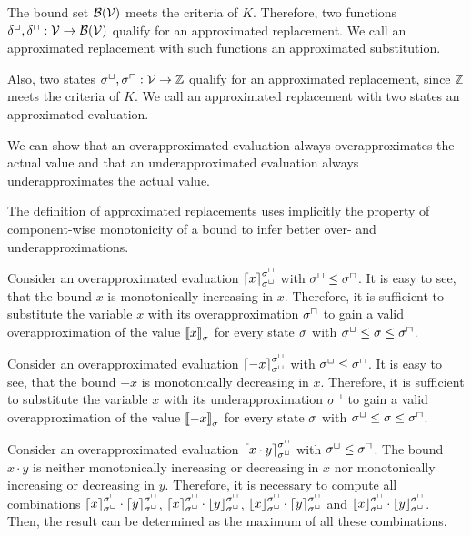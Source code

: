 The bound set $\mathcal{B}(\mathcal{V})$ meets the criteria of $K$.
Therefore, two functions $\delta^\sqcup, \delta^\sqcap: \mathcal{V} \rightarrow \mathcal{B}(\mathcal{V})$ qualify for an approximated replacement.
We call an approximated replacement with such functions an approximated substitution.

Also, two states ${\sigma^\sqcup}, {\sigma^\sqcap}: \mathcal{V} \rightarrow \mathbb{Z}$ qualify for an approximated replacement, since $\mathbb{Z}$ meets the criteria of $K$.
We call an approximated replacement with two states an approximated evaluation.

We can show that an overapproximated evaluation always overapproximates the actual value and that an underapproximated evaluation always underapproximates the actual value.



\begin{example}
  The definition of approximated replacements uses implicitly the property of component-wise monotonicity of a bound to infer better over- and underapproximations.

  Consider an overapproximated evaluation $\left\lceil x \right\rceil^{{\sigma^\sqcap}}_{{\sigma^\sqcup}}$ with ${\sigma^\sqcup} \leq {\sigma^\sqcap}$.
  It is easy to see, that the bound $x$ is monotonically increasing in $x$.
  Therefore, it is sufficient to substitute the variable $x$ with its overapproximation ${\sigma^\sqcap}$ to gain a valid overapproximation of the value $\left\llbracket x \right\rrbracket_{\sigma}$ for every state $\sigma$ with ${\sigma^\sqcup} \leq \sigma \leq {\sigma^\sqcap}$.
  
  Consider an overapproximated evaluation $\left\lceil -x \right\rceil^{{\sigma^\sqcap}}_{{\sigma^\sqcup}}$ with ${\sigma^\sqcup} \leq {\sigma^\sqcap}$.
  It is easy to see, that the bound $-x$ is monotonically decreasing in $x$.
  Therefore, it is sufficient to substitute the variable $x$ with its underapproximation ${\sigma^\sqcup}$ to gain a valid overapproximation of the value $\left\llbracket -x \right\rrbracket_{\sigma}$ for every state $\sigma$ with ${\sigma^\sqcup} \leq \sigma \leq {\sigma^\sqcap}$.
  
  Consider an overapproximated evaluation $\left\lceil x \cdot y \right\rceil^{{\sigma^\sqcap}}_{{\sigma^\sqcup}}$ with ${\sigma^\sqcup} \leq {\sigma^\sqcap}$.
  The bound $x \cdot y$ is neither monotonically increasing or decreasing in $x$ nor monotonically increasing or decreasing in $y$.
  Therefore, it is necessary to compute all combinations $\left\lceil x \right\rceil^{{\sigma^\sqcap}}_{{\sigma^\sqcup}} \cdot \left\lceil y \right\rceil^{{\sigma^\sqcap}}_{{\sigma^\sqcup}}$, $\left\lceil x \right\rceil^{{\sigma^\sqcap}}_{{\sigma^\sqcup}} \cdot \left\lfloor y \right\rfloor^{{\sigma^\sqcap}}_{{\sigma^\sqcup}}$, $\left\lfloor x \right\rfloor^{{\sigma^\sqcap}}_{{\sigma^\sqcup}} \cdot \left\lceil y \right\rceil^{{\sigma^\sqcap}}_{{\sigma^\sqcup}}$ and $\left\lfloor x \right\rfloor^{{\sigma^\sqcap}}_{{\sigma^\sqcup}} \cdot \left\lfloor y \right\rfloor^{{\sigma^\sqcap}}_{{\sigma^\sqcup}}$.
  Then, the result can be determined as the maximum of all these combinations.
\end{example}

